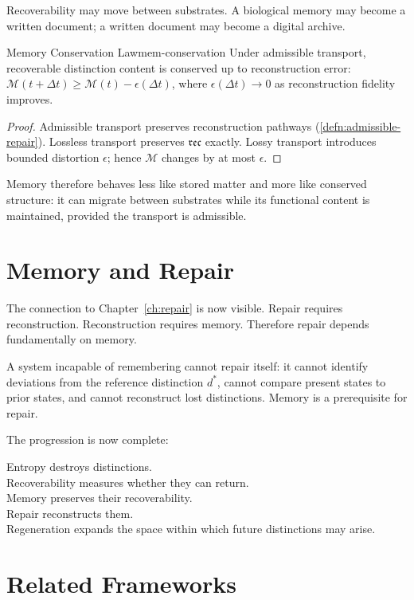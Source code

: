 \documentclass[12pt,twoside,openright]{book}
\newcommand{\reco}{\mathfrak{rec}}
\begin{document}
Recoverability may move between substrates. A biological
memory may become a written document; a written document
may become a digital archive.

\begin{theorem}{Memory Conservation Law}{mem-conservation}
  Under admissible transport, recoverable distinction
  content is conserved up to reconstruction error:
  $\mathcal{M}(t + \Delta t) \ge \mathcal{M}(t) -
  \epsilon(\Delta t)$, where $\epsilon(\Delta t) \to 0$
  as reconstruction fidelity improves.
\end{theorem}

\begin{proof}
  Admissible transport preserves reconstruction pathways
  (\cref{defn:admissible-repair}). Lossless transport
  preserves $\reco$ exactly. Lossy transport introduces
  bounded distortion $\epsilon$; hence $\mathcal{M}$
  changes by at most $\epsilon$.
\end{proof}

Memory therefore behaves less like stored matter and more
like conserved structure: it can migrate between substrates
while its functional content is maintained, provided the
transport is admissible.

\section{Memory and Repair}
\label{sec:ch6-repair}

The connection to Chapter~\ref{ch:repair} is now visible.
Repair requires reconstruction. Reconstruction requires
memory. Therefore repair depends fundamentally on memory.

A system incapable of remembering cannot repair itself:
it cannot identify deviations from the reference
distinction $d^*$, cannot compare present states to prior
states, and cannot reconstruct lost distinctions. Memory
is a prerequisite for repair.

The progression is now complete:
\begin{center}
Entropy destroys distinctions.\\
Recoverability measures whether they can return.\\
Memory preserves their recoverability.\\
Repair reconstructs them.\\
Regeneration expands the space within which future
distinctions may arise.
\end{center}

\section{Related Frameworks}
\label{sec:ch6-related-frameworks}
\end{document}
